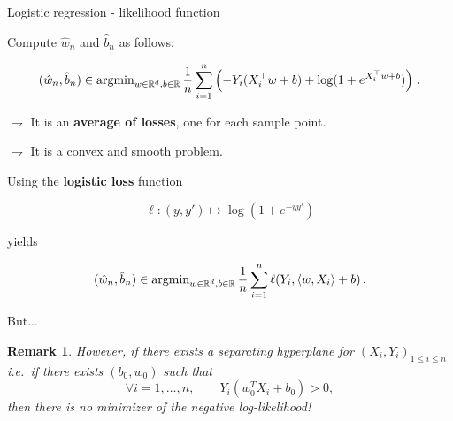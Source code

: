 \documentclass[xcolor={usenames,dvipsnames}]{beamer}
\newtheorem{remark}[theorem]{Remark}
\begin{document}
\begin{frame}{Logistic regression - likelihood function}
		
Compute $\hat w_n$ and $\hat b_n$ as follows:

\begin{align*}
(\hat w_n, \hat b_n) \in \operatorname{argmin}_{w \in \mathbb{R}^d, b \in \mathbb{R}}
\frac 1n \sum_{i=1}^n\left(-Y_i (X_i^\top w+ b) +  \log(1+ e^{X_i^\top w + b})\right)\,.
\end{align*}

\vspace{.3cm}

$\rightharpoondown$ It is an \textbf{average of losses}, one for each sample point.

$\rightharpoondown$ It is a \alert{convex and smooth problem}.


\medskip

Using the \textbf{\alert{logistic loss}} function
\smallskip 

\begin{equation*}
\ell: (y, y') \mapsto \log(1 + e^{-y y'}) 
\end{equation*}

yields

\begin{equation*}
(\hat w_n, \hat b_n) \in \operatorname{argmin}_{w \in \mathbb{R}^d, b \in \mathbb{R}}
\frac 1n \sum_{i=1}^n \ell(Y_i, \langle w,X_i \rangle + b)\,.
\end{equation*}
\end{frame}


%

\begin{frame}{But...}
\begin{remark}
However, if there exists a separating hyperplane for $(X_i,Y_i)_{1\leq i \leq n}$ i.e.\ if there exists $(b_0,w_0)$ such that
$$
\forall i=1,\hdots , n , \qquad Y_i (w_0^T X_i +b_0) >0,
$$
then there is no minimizer of the negative log-likelihood! 
\end{remark}
\end{frame}
\end{document}
